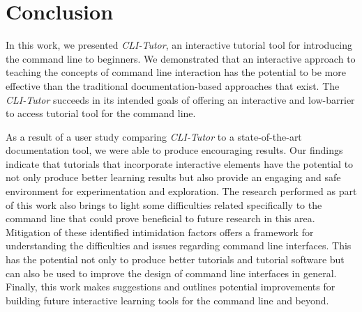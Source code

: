 \chapter{Conclusion}
\label{chap:conclusion}

In this work, we presented \textit{CLI-Tutor}, an interactive tutorial tool for
introducing the command line to beginners. We demonstrated that an interactive
approach to teaching the concepts of command line interaction has the
potential to be more effective than the traditional documentation-based
approaches that exist. The \textit{CLI-Tutor} succeeds in its intended goals of
offering an interactive and low-barrier to access tutorial tool for
the command line.

As a result of a user study comparing \textit{CLI-Tutor} to
a state-of-the-art documentation tool, we were able to produce encouraging
results. Our findings indicate that tutorials that incorporate interactive
elements have the potential to not only produce better learning results but
also provide an engaging and safe environment for experimentation and
exploration. The research performed as part of this work also brings to light
some difficulties related specifically to the command line that could prove
beneficial to future research in this area. Mitigation of these identified
intimidation factors offers a framework for understanding the difficulties and
issues regarding command line interfaces. This has the potential not only to
produce better tutorials and tutorial software but can also be used to improve
the design of command line interfaces in general. Finally, this work makes
suggestions and outlines potential improvements for building future interactive
learning tools for the command line and beyond.
